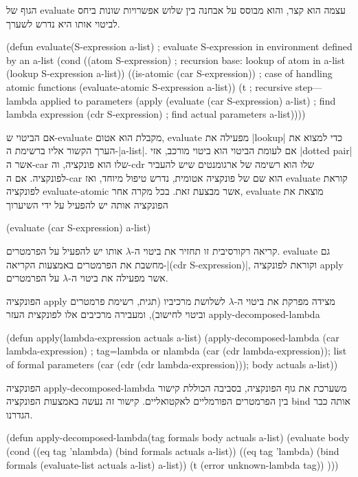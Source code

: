 הגוף של evaluate עצמה הוא קצר, והוא מבוסס על אבחנה בין שלוש אפשרויות שונות ביחס
לביטוי אותו היא נדרש לשערך.

\minipage\textwidth
\begin{KERNEL}
(defun evaluate(S-expression a-list) ; evaluate S-expression in environment defined by an a-list
  (cond ((atom S-expression) ; recursion base: lookup of atom in a-list
          (lookup S-expression a-list))
        ((is-atomic (car S-expression)) ; case of handling atomic functions
          (evaluate-atomic S-expression a-list))
        (t ; recursive step---lambda applied to parameters
          (apply (evaluate (car S-expression) a-list) ; find lambda expression
                  (cdr S-expression) ; find actual parameters
                  a-list))))
\end{KERNEL}
\endminipage

אם הביטוי ש-evaluate מקבלת הוא אטום, evaluate מפעילה את \E|lookup| כדי למצוא את
הערך הקשור אליו ברשימת ה-\E|a-list|. אם לעומת הביטוי הוא ביטוי מורכב, אזי
\E|dotted pair| אשר ה-car שלו הוא פונקציה, וה-cdr שלו הוא רשימה של
ארגומנטים שיש להעביר לפונקציה. אם ה-car הוא שם של פונקציה אטומית, נדרש טיפול
מיוחד, ואז evaluate קוראת לפונקציה evaluate-atomic אשר מבצעת זאת.
בכל מקרה אחר, evaluate מוצאת את הפונקציה אותה יש להפעיל על ידי השיערוך
\begin{LISP}
(evaluate (car S-expression) a-list)
\end{LISP}
קריאה רקורסיבית זו תחזיר את ביטוי ה-$λ$ אותו יש להפעיל על הפרמטרים. evaluate
גם מחשבת את הפרמטרים באמצעות הקריאה-\T|(cdr S-expression)|, וקוראת לפונקציה
apply אשר מפעילה את ביטוי ה-$λ$ על הפרמטרים.

הפונקציה apply מצידה מפרקת את ביטוי ה-$λ$ לשלושת מרכיביו (תגית, רשימת פרמטרים
וביטוי לחישוב), ומעבירה מרכיבים אלו לפונקצית העזר apply-decomposed-lambda
\begin{KERNEL}
(defun apply(lambda-expression actuals a-list)
  (apply-decomposed-lambda
    (car lambda-expression) ; tag=lambda or nlambda
    (car (cdr lambda-expression)); list of formal parameters
    (car (cdr (cdr lambda-expression))); body
    actuals
    a-list))
\end{KERNEL}
הפונקציה apply-decomposed-lambda משערכת את גוף הפונקציה, בסביבה הכוללת קישור בין
הפרמטרים הפורמליים לאקטואליים. קישור זה נעשה באמצעות הפונקציה bind אותה כבר
הגדרנו.
\begin{KERNEL}
(defun apply-decomposed-lambda(tag formals body actuals a-list)
  (evaluate body
    (cond ((eq tag 'nlambda) (bind formals actuals a-list))
          ((eq tag 'lambda) (bind formals (evaluate-list actuals a-list) a-list))
          (t (error unknown-lambda tag))
)))
\end{KERNEL}

